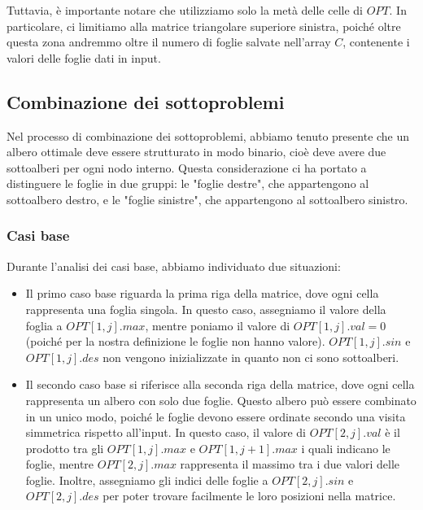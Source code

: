 Tuttavia, è importante notare che utilizziamo solo la metà delle celle di $OPT$. In particolare,
ci limitiamo alla matrice triangolare superiore sinistra, poiché oltre questa 
zona andremmo oltre il numero di foglie salvate nell'array $C$, contenente i valori delle foglie dati in input.

\subsection{Combinazione dei sottoproblemi}

Nel processo di combinazione dei sottoproblemi, abbiamo tenuto presente che un albero ottimale deve essere strutturato in modo binario, cioè deve avere due 
sottoalberi per ogni nodo interno. Questa considerazione ci ha portato a distinguere le foglie in due gruppi: le "foglie destre", che appartengono al sottoalbero 
destro, e le "foglie sinistre", che appartengono al sottoalbero sinistro.

\subsubsection*{Casi base}

Durante l'analisi dei casi base, abbiamo individuato due situazioni:

\begin{itemize}
	\item {
		Il primo caso base riguarda la prima riga della matrice, dove ogni cella rappresenta una foglia singola. In questo caso, assegniamo il valore della foglia a $OPT[1, j].max$, 
		mentre poniamo il valore di $OPT[1, j].val = 0$ (poiché per la nostra definizione le foglie non hanno valore). $OPT[1, j].sin$ e $OPT[1, j].des$ non vengono inizializzate in quanto 
		non ci sono sottoalberi.
	}
	\item {
		Il secondo caso base si riferisce alla seconda riga della matrice, dove ogni cella rappresenta un albero con solo due foglie. Questo albero può essere combinato in un 
		unico modo, poiché le foglie devono essere ordinate secondo una visita simmetrica rispetto all'input. In questo caso, il valore di $OPT[2, j].val$ è il prodotto tra 
		gli $OPT[1, j].max$ e $OPT[1, j + 1].max$ i quali indicano le foglie, mentre $OPT[2, j].max$ rappresenta il massimo tra i due valori delle foglie. Inoltre, assegniamo gli indici delle foglie a $OPT[2, j].sin$ e $OPT[2, j].des$ 
		per poter trovare facilmente le loro posizioni nella matrice.
	}
\end{itemize}

